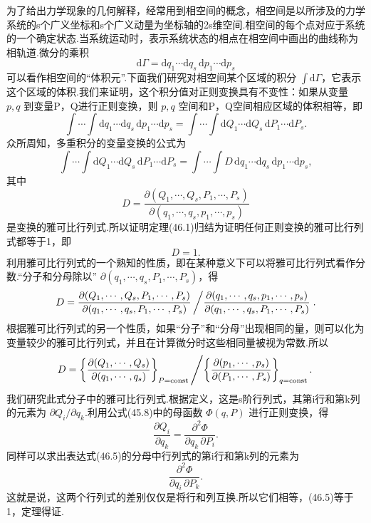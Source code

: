 为了给出力学现象的几何解释，经常用到相空间的概念，相空间是以所涉及的力学系统的s个广义坐标和s个广义动量为坐标轴的2s维空间.相空间的每个点对应于系统的一个确定状态.当系统运动时，表示系统状态的相点在相空间中画出的曲线称为相轨道.微分的乘积
\begin{equation*}
  \mathrm{d}\Gamma=\mathrm{d}q_1\cdots\mathrm{d}q_s\,
  \mathrm{d}p_1\cdots\mathrm{d}p_s
\end{equation*}
可以看作相空间的“体积元”.下面我们研究对相空间某个区域的积分
$\int\mathrm{d}\Gamma$，它表示这个区域的体积.我们来证明，这个积分值对正则变换具有不变性：如果从变量
$p,q$ 到变量P，Q进行正则变换，则 $p,q$ 空间和P，Q空间相应区域的体积相等，即
\begin{equation}
  \int\cdots\int\mathrm{d}q_1\cdots\mathrm{d}q_s\,\mathrm{d}p_1\cdots\mathrm{d}p_s
  =\int\cdots\int\mathrm{d}Q_1\cdots\mathrm{d}Q_s\,\mathrm{d}P_1\cdots\mathrm{d}P_s.
\end{equation}
众所周知，多重积分的变量变换的公式为
\begin{equation*}
  \int\cdots\int\mathrm{d}Q_1\cdots\mathrm{d}Q_s\,\mathrm{d}P_1\cdots\mathrm{d}P_s
  =\int\cdots\int D\,\mathrm{d}q_1\cdots\mathrm{d}q_s\,
  \mathrm{d}p_1\cdots\mathrm{d}p_s,
\end{equation*}
其中
\begin{equation}
  D=\frac{\partial(Q_1,\cdots,Q_s,P_1,\cdots,P_s)}
  {\partial(q_1,\cdots,q_s,p_1,\cdots,p_s)}
\end{equation}
是变换的雅可比行列式.所以证明定理(46.1)归结为证明任何正则变换的雅可比行列式都等于1，即
\begin{equation}
  D=1.
\end{equation}
利用雅可比行列式的一个熟知的性质，即在某种意义下可以将雅可比行列式看作分数.“分子和分母除以”
$\partial(q_1,\cdots,q_s,P_1,\cdots,P_s)$，得
\begin{equation}
  D=\frac{\partial(Q_1,\cdots,Q_s,P_1,\cdots,P_s)}
  {\partial(q_1,\cdots,q_s,P_1,\cdots,P_s)}
  \left/\frac{\partial(q_1,\cdots,q_s,p_1,\cdots,p_s)}
  {\partial(q_1,\cdots,q_s,P_1,\cdots,P_s)}\right..
\end{equation}
根据雅可比行列式的另一个性质，如果“分子”和“分母”出现相同的量，则可以化为变量较少的雅可比行列式，并且在计算微分时这些相同量被视为常数.所以
\begin{equation}
  D=\left\{\frac{\partial(Q_1,\cdots,Q_s)}{\partial(q_1,\cdots,q_s)}\right\}_{P=\mathrm{const}}
  \left/\left\{\frac{\partial(p_1,\cdots,p_s)}{\partial(P_1,\cdots,P_s)}\right\}_{q=\mathrm{const}}.\right.
\end{equation}
我们研究此式分子中的雅可比行列式.根据定义，这是s阶行列式，其第i行和第k列的元素为
$\partial Q_i/\partial q_k$.利用公式(45.8)中的母函数 $\Phi(q,P)$
进行正则变换，得
\begin{equation*}
  \frac{\partial Q_i}{\partial q_k}
  =\frac{\partial^2\Phi}{\partial q_k\,\partial P_i}.
\end{equation*}
同样可以求出表达式(46.5)的分母中行列式的第i行和第k列的元素为
\begin{equation*}
  \frac{\partial^2\Phi}{\partial q_i\,\partial P_k}.
\end{equation*}
这就是说，这两个行列式的差别仅仅是将行和列互换.所以它们相等，(46.5)等于1，定理得证.

